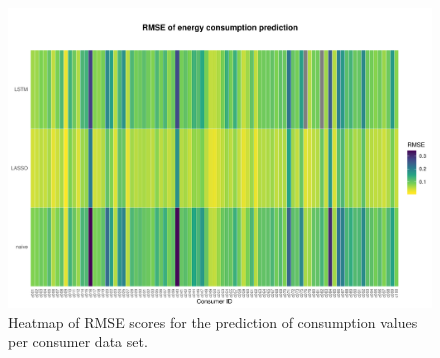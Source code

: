 %
\begin{figure}[htbp]
 \centering
\includegraphics[width=\textwidth]{thesis/graphs/evaluation/c_heatmap_RMSE.pdf}
\caption[Heatmap of RMSE scores for consumption values]{Heatmap of  RMSE scores for the prediction of consumption values per consumer data set. \quantnet\href{ }{}}
\label{Fig:heatmapRMSE}
\end{figure}
%

